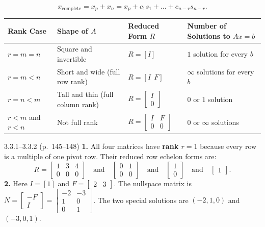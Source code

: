 \documentclass[11pt,a4paper,openany,oneside]{book}
\def\vect#1{#1}%
\def\mathbf#1{#1}%
\newcommand{\vect}[1]{\mathbf{#1}}
\numberwithin{equation}{chapter}
\begin{document}
\begin{result}
\begin{equation}
\vect{x}_{\text{complete}} = \vect{x}_p + \vect{x}_n = \vect{x}_p + c_1\vect{s}_1 + \dots + c_{n-r}\vect{s}_{n-r}.
\end{equation}
\begin{center}
\small
\begin{tabular}{@{}llll@{}}
\toprule
\textbf{Rank Case} & \textbf{Shape of $A$} & \textbf{Reduced Form $R$} & \textbf{Number of Solutions to $A\vect{x}=\vect{b}$} \\
\midrule
$r = m = n$ & Square and invertible & $R = [I]$ & $1$ solution for every $\vect{b}$ \\
$r = m < n$ & Short and wide (full row rank) & $R = [I \ \ F]$ & $\infty$ solutions for every $\vect{b}$ \\
$r = n < m$ & Tall and thin (full column rank) & $R = \begin{bmatrix}I\\\vect{0}\end{bmatrix}$ & $0$ or $1$ solution \\
$r < m$ and $r < n$ & Not full rank & $R = \begin{bmatrix}I & F\\\vect{0} & \vect{0}\end{bmatrix}$ & $0$ or $\infty$ solutions \\
\bottomrule
\end{tabular}
\end{center}
\end{result}

\vfill
\begin{pageend_sol}{3.3.1--3.3.2 (p.\ 145--148)}
\textbf{1.} All four matrices have \textbf{rank $r = 1$} because every row is a multiple of one pivot row. Their reduced row echelon forms are:
\[
R = \begin{bmatrix} 1 & 3 & 4 \\ 0 & 0 & 0 \end{bmatrix} \quad \text{and} \quad \begin{bmatrix} 0 & 1 \\ 0 & 0 \end{bmatrix} \quad \text{and} \quad \begin{bmatrix} 1 \\ 0 \end{bmatrix} \quad \text{and} \quad \begin{bmatrix} 1 \end{bmatrix}.
\]
\textbf{2.} Here $I = [1]$ and $F = \begin{bmatrix}2 & 3\end{bmatrix}$. The nullspace matrix is $N = \begin{bmatrix}-F\\I\end{bmatrix} = \begin{bmatrix}-2 & -3\\1 & 0\\0 & 1\end{bmatrix}$. The two special solutions are $(-2,1,0)$ and $(-3,0,1)$.
\end{pageend_sol}
\clearpage
\end{document}
